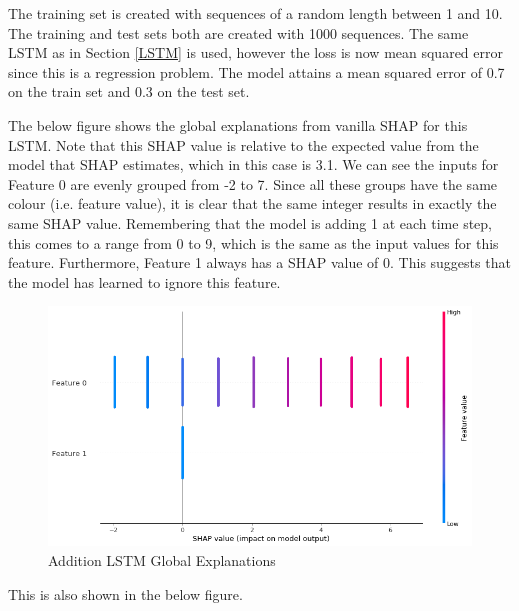 \documentclass[12pt]{article}
\begin{document}
The training set is created with sequences of a random length between 1 and 10. The training and test sets both are created with 1000 sequences. The same LSTM as in Section \ref{LSTM} is used, however the loss is now mean squared error since this is a regression problem. The model attains a mean squared error of 0.7 on the train set and 0.3 on the test set.

The below figure shows the global explanations from vanilla SHAP for this LSTM. Note that this SHAP value is relative to the expected value from the model that SHAP estimates, which in this case is 3.1. We can see the inputs for Feature 0 are evenly grouped from -2 to 7. 
Since all these groups have the same colour (i.e. feature value), it is clear that the same integer results in exactly the same SHAP value. Remembering that the model is adding 1 at each time step, this comes to a range from 0 to 9, which is the same as the input values for this feature. Furthermore, Feature 1 always has a SHAP value of 0. This suggests that the model has learned to ignore this feature.

\begin{figure}[H]
\centering\caption{Addition LSTM Global Explanations}
\includegraphics[scale=0.5]{Sanity Old Global.png}
\end{figure}
This is also shown in the below figure. 
\end{document}
